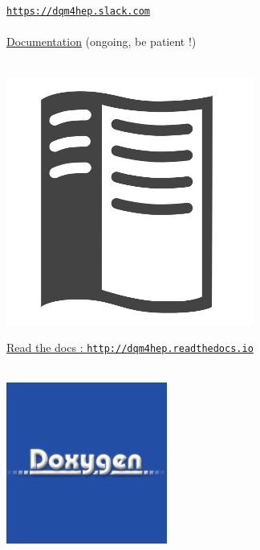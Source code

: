 \documentclass[presentation, 10pt]{beamer}
\begin{document}
\begin{frame}
\begin{minipage}{0.035\linewidth}
  \end{minipage}
  \href{https://dqm4hep.slack.com}{\tt https://dqm4hep.slack.com} \\
  ~\\
  \underline{Documentation} (ongoing, be patient !) \\
  \vspace*{0.1cm}
  ~~~
  \begin{minipage}{0.03\linewidth}
    \includegraphics[width=\linewidth]{figs/rtd-logo.png}
  \end{minipage}
  \href{http://dqm4hep.readthedocs.io}{Read the docs : \tt http://dqm4hep.readthedocs.io} \\
  ~~~
  \begin{minipage}{0.03\linewidth}
    \includegraphics[width=\linewidth]{figs/doxygen-logo.png}

\end{minipage}
\end{frame}
\end{document}
